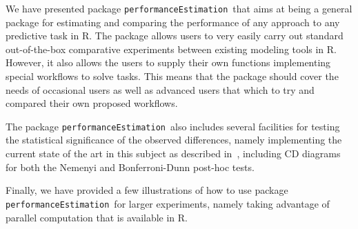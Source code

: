 \documentclass[10pt,a4paper]{article}\usepackage[]{graphicx}\usepackage[]{color}
\newcommand{\PE}{package \texttt{performanceEstimation}\ }
\begin{document}
We have presented \PE that aims at being a general package for estimating and comparing the performance of any approach to any predictive task in R. The package allows users to very easily carry out standard out-of-the-box comparative experiments between existing modeling tools in R. However, it also allows the users to supply their own functions implementing special workflows to solve tasks. This means that the package should cover the needs of occasional users as well as advanced users that which to try and compared their own proposed workflows.

The \PE also includes several facilities for testing the statistical significance of the observed differences, namely implementing the current state of the art in this subject as described in~\cite{Dem06}, including CD diagrams for both the Nemenyi and Bonferroni-Dunn post-hoc tests.

Finally, we have provided a few illustrations of how to use \PE for larger experiments, namely taking advantage of parallel computation that is available in R.



\end{document}
